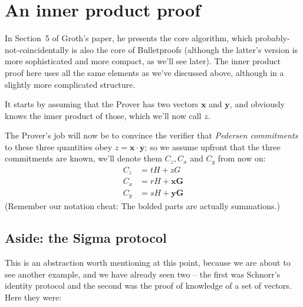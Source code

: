 \documentclass[10pt,a4paper]{article}
\begin{document}
\hypertarget{an-inner-product-proof}{%
\section[An inner product
proof]{\texorpdfstring{\protect\hypertarget{anchor-34}{}{}An inner
product proof}{An inner product proof}}\label{an-inner-product-proof}}

In Section~5 of Groth's paper, he presents the core algorithm, which
probably-not-coincidentally is also the core of Bulletproofs (although
the latter's version is more sophisticated and more compact, as we'll
see later). The inner product proof here uses all the same elements as
we've discussed above, although in a slightly more complicated
structure.

It starts by assuming that the Prover has two vectors $\mathbf{x}$ and
$\mathbf{y}$, and obviously knows the inner product of those, which we'll
now call $z$.

The Prover's job will now be to convince the verifier that
\emph{Pedersen commitments }to these three quantities obey $z = \mathbf{x} \cdot \mathbf{y}$; so we
assume upfront that the three commitments are known, 
we'll denote them $C_z, C_x$ and $C_y$ from now on:
\begin{align}
C_z &= tH + zG \label{inner_product_proof_C_xyz_def:1}\\
C_x &= rH + \mathbf{xG} \label{inner_product_proof_C_xyz_def:2}\\
C_y &= sH + \mathbf{yG} \label{inner_product_proof_C_xyz_def:3}
\end{align}
(Remember our notation cheat: The bolded parts are actually summations.)

\hypertarget{aside-the-sigma-protocol}{%
\subsection[Aside: the Sigma
protocol]{\texorpdfstring{\protect\hypertarget{anchor-35}{}{}Aside: the
Sigma
protocol}{Aside: the Sigma protocol}}\label{aside-the-sigma-protocol}}

This is an abstraction worth mentioning at this point, because we are
about to see another example, and we have already seen two -- the first was 
Schnorr's identity protocol and the second was the proof of knowledge 
of a set of vectors. Here they were:
\end{document}
